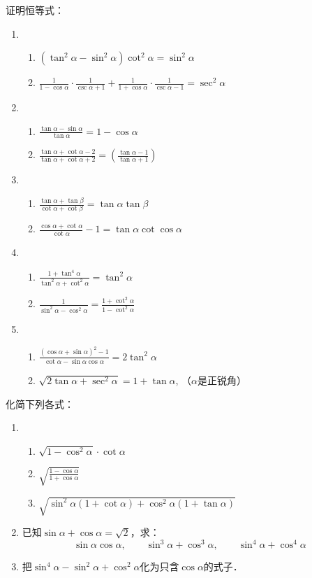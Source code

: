 \begin{ex}    
    证明恒等式：
\begin{enumerate}
    \item \begin{enumerate}
        \item $(\tan^2\alpha-\sin^2\alpha)\cot^2\alpha=\sin^2\alpha$
        \item $\frac{1}{1-\cos\alpha}\cdot\frac{1}{\csc\alpha+1}+\frac{1}{1+\cos\alpha}\cdot \frac{1}{\csc\alpha-1}=\sec^2\alpha$
    \end{enumerate}
\item \begin{enumerate}
    \item $\frac{\tan\alpha-\sin\alpha}{\tan \alpha}=1-\cos\alpha$
    \item $\frac{\tan\alpha+\cot\alpha-2}{\tan\alpha+\cot\alpha+2}=\left(\frac{\tan \alpha-1}{\tan\alpha+1}\right)$
\end{enumerate}
\item \begin{enumerate}
    \item $\frac{\tan\alpha+\tan\beta}{\cot\alpha+\cot\beta}=\tan\alpha\tan\beta$
    \item $\frac{\cos\alpha+\cot\alpha}{\cot\alpha}-1=\tan\alpha\cot \cos\alpha$
\end{enumerate}

\item\begin{enumerate}
    \item  $\frac{1+\tan^4\alpha}{\tan^2\alpha+\cot^2\alpha}=\tan^2\alpha$
    \item $\frac{1}{\sin^2\alpha-\cos^2\alpha}=\frac{1+\cot^2\alpha}{1-\cot^2\alpha}$
\end{enumerate}
\item \begin{enumerate}
\item $\frac{(\cos\alpha+\sin\alpha)^2-1}{\cot\alpha-\sin\alpha\cos\alpha}=2\tan^2 \alpha$
    \item $\sqrt{2\tan\alpha+\sec^2\alpha}=1+\tan\alpha$,  （$\alpha$是正锐角）   
\end{enumerate}
\end{enumerate}
       
   化简下列各式：
\begin{enumerate}
    \item \begin{enumerate}
        \item $\sqrt{1-\cos^2\alpha}\cdot \cot \alpha$
        \item $\sqrt{\frac{1-\cos\alpha}{1+\cos\alpha}}$
        \item $\sqrt{\sin^2\alpha(1+\cot\alpha)+\cos^2\alpha(1+\tan\alpha)}$
    \end{enumerate}
\item 已知$\sin\alpha+\cos\alpha=\sqrt{2}$，求：
\[\sin\alpha\cos\alpha,\qquad \sin^3\alpha+\cos^3\alpha,\qquad \sin^4\alpha+\cos^4\alpha\]
\item 把$\sin^4\alpha-\sin^2\alpha+\cos^2\alpha$化为只含$\cos\alpha$的式子．
\end{enumerate}
\end{ex}

